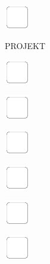 \documentclass[11pt,titlepage]{article}
\begin{document}
\vspace{12mm}

\noindent
\includegraphics[]{checkbox-6mm.pdf}

\pagebreak

\small
\hfill PROJEKT

\vspace{6mm}

\noindent
\includegraphics[]{checkbox-6mm.pdf}

\vspace{12mm}

\noindent
\includegraphics[]{checkbox-6mm.pdf}

\vspace{12mm}

\noindent
\includegraphics[]{checkbox-6mm.pdf}

\vspace{12mm}

\noindent
\includegraphics[]{checkbox-6mm.pdf}

\vspace{12mm}

\noindent
\includegraphics[]{checkbox-6mm.pdf}

\vspace{12mm}

\noindent
\includegraphics[]{checkbox-6mm.pdf}

\vspace{12mm}
\end{document}
